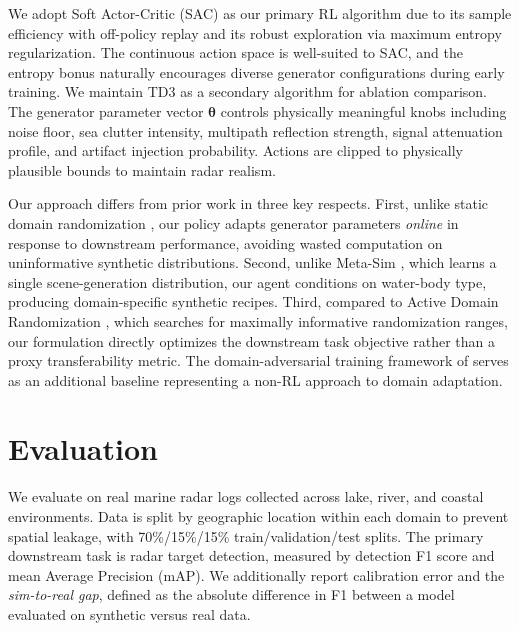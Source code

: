 \documentclass[12pt]{article}
\begin{document}
We adopt Soft Actor-Critic (SAC) \citep{Haarnoja2018SAC} as our primary RL algorithm due to its sample efficiency with off-policy replay and its robust exploration via maximum entropy regularization. The continuous action space is well-suited to SAC, and the entropy bonus naturally encourages diverse generator configurations during early training. We maintain TD3 \citep{Fujimoto2018TD3} as a secondary algorithm for ablation comparison. The generator parameter vector $\boldsymbol{\theta}$ controls physically meaningful knobs including noise floor, sea clutter intensity, multipath reflection strength, signal attenuation profile, and artifact injection probability. Actions are clipped to physically plausible bounds to maintain radar realism.

Our approach differs from prior work in three key respects. First, unlike static domain randomization \citep{Tobin2017DomainRandomization, Tremblay2018TrainingDNN}, our policy adapts generator parameters \textit{online} in response to downstream performance, avoiding wasted computation on uninformative synthetic distributions. Second, unlike Meta-Sim \citep{Kar2019MetaSim}, which learns a single scene-generation distribution, our agent conditions on water-body type, producing domain-specific synthetic recipes. Third, compared to Active Domain Randomization \citep{Mehta2020ActiveDR}, which searches for maximally informative randomization ranges, our formulation directly optimizes the downstream task objective rather than a proxy transferability metric. The domain-adversarial training framework of \citet{Ganin2016DomainAdversarial} serves as an additional baseline representing a non-RL approach to domain adaptation.

\section{Evaluation}

We evaluate on real marine radar logs collected across lake, river, and coastal environments. Data is split by geographic location within each domain to prevent spatial leakage, with 70\%/15\%/15\% train/validation/test splits. The primary downstream task is radar target detection, measured by detection F1 score and mean Average Precision (mAP). We additionally report calibration error and the \textit{sim-to-real gap}, defined as the absolute difference in F1 between a model evaluated on synthetic versus real data.
\end{document}
